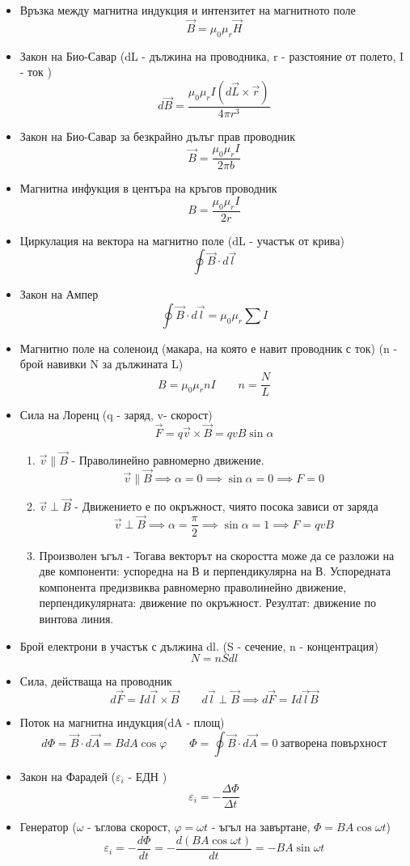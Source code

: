 \documentclass[fleqn, 12pt]{article}
\theoremstyle{definition}
\begin{document}
\begin{itemize}
\item Връзка между магнитна индукция и интензитет на магнитното поле
$$\vec{B} = \mu_0 \mu_r \vec{H}$$
\item Закон на Био-Савар (dL - дължина на проводника, r - разстояние от полето, I - ток )
$$d\vec{B} = \frac{\mu_0 \mu_r I(d\vec{L} \times \vec{r})}{4 \pi r^3}$$
\item Закон на Био-Савар за безкрайно дълъг прав проводник
$$\vec{B} = \frac{\mu_0 \mu_r I}{2 \pi b}$$
\item Магнитна инфукция в центъра на кръгов проводник
$$B = \frac{\mu_0 \mu_r I}{2r}$$
\item Циркулация на вектора на магнитно поле (dL - участък от крива)
$$\oint \vec{B} \cdot d\vec{l}$$
\item Закон на Ампер
$$\oint \vec{B} \cdot d\vec{l} = \mu_0 \mu_r \sum I$$
\item Магнитно поле на соленоид (макара, на която е навит проводник с ток) (n - брой навивки N за дължината L)
$$B = \mu_0 \mu_r nI \qquad n = \frac{N}{L}$$
\item Сила на Лоренц (q - заряд, v- скорост)
$$\vec{F} = q\vec{v} \times \vec{B} = qvB\sin\alpha$$
\begin{enumerate}
\item $\vec{v} \parallel \vec{B}$ -  Праволинейно равномерно движение. 
$$\vec{v} \parallel \vec{B} \implies \alpha = 0 \implies \sin\alpha = 0 \implies F = 0$$
\item $\vec{v} \perp \vec{B}$ - Движението е по окръжност, чиято посока зависи от заряда
$$\vec{v} \perp \vec{B} \implies \alpha = \frac{\pi}{2} \implies \sin\alpha = 1 \implies F = qvB$$
\item Произволен ъгъл - 
Тогава векторът на скоростта може да се разложи
на две компоненти: успоредна на В и
перпендикулярна на В. Успоредната
компонента предизвиква равномерно
праволинейно движение,
перпендикулярната: движение по
окръжност. Резултат: движение по
винтова линия.
\end{enumerate}
\item Брой електрони в участък с дължина dl. (S - сечение, n - концентрация)
$$N = nSdl$$
\item Сила, действаща на проводник
$$d\vec{F} = I d\vec{l} \times \vec{B} \qquad  d\vec{l} \perp \vec{B} \implies d\vec{F} = I d\vec{l}\vec{B}$$
\item Поток на магнитна индукция(dA - площ)
$$d \Phi = \vec{B} \cdot d\vec{A} = BdA \cos \varphi \qquad \Phi = \oint \vec{B} \cdot d\vec{A} = 0 \ \text{затворена повърхност}$$
\item Закон на Фарадей ($\varepsilon_i$ - ЕДН )
$$\varepsilon_i = - \frac{\Delta \Phi}{\Delta t}$$
\item Генератор ($\omega$ - ъглова скорост, $\varphi = \omega t$ - ъгъл на завъртане, $\Phi = BA\cos\omega t$)
$$\varepsilon_i = - \frac{d\Phi}{dt} = - \frac{d(BA\cos\omega t)}{dt} = -BA\sin\omega t $$
\end{itemize}
\end{document}
